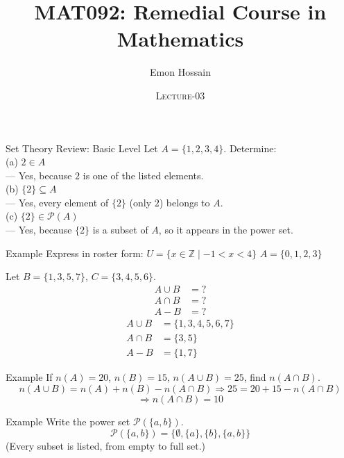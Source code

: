 \documentclass[11pt]{beamer}
\author[] %
{Emon Hossain\inst{1}}
\institute[University of Dhaka] %
{
  \inst{1}%
  Lecturer\\MNS department\\Brac University
}
\date[] %
{\textsc{Lecture-03}}
\title[]{MAT092: Remedial Course in Mathematics}
\theoremstyle{plain}
\begin{document}
\begin{frame}
\titlepage
\end{frame}

\begin{frame}{Set Theory Review: Basic Level}
\small
Let $A = \{1, 2, 3, 4\}$. Determine:  \\
(a) $2 \in A$  \\
\pause
— Yes, because $2$ is one of the listed elements.  \\
(b) $\{2\} \subseteq A$\\
\pause
— Yes, every element of $\{2\}$ (only $2$) belongs to $A$.\\
(c) $\{2\} \in \mathcal{P}(A)$\\
\pause
— Yes, because $\{2\}$ is a subset of $A$, so it appears in the power set.
\end{frame}

\begin{frame}{Example}
Express in roster form:  
$U = \{x \in \mathbb{Z} \mid -1 < x < 4\}$  
\pause
$A = \{0, 1, 2, 3\}$

Let $B = \{1,3,5,7\}$, $C = \{3,4,5,6\}$.  
\begin{align*}
A \cup B &= ?\\
A \cap B &= ? \\
A - B &= ?
\end{align*}
\pause
\begin{align*}
A \cup B &= \{1,3,4,5,6,7\} \\
A \cap B &= \{3,5\} \\
A - B &= \{1,7\}
\end{align*}
\end{frame}


\begin{frame}{Example}
    If $n(A)=20$, $n(B)=15$, $n(A \cup B)=25$, find $n(A \cap B)$.
    \pause
\[
n(A \cup B) = n(A) + n(B) - n(A \cap B) \Rightarrow 25 = 20 + 15 - n(A \cap B)
\]
\[
\Rightarrow n(A \cap B) = 10
\]
\end{frame}

\begin{frame}{Example}
    Write the power set $\mathcal{P}(\{a,b\})$.  
    \pause
\[
\mathcal{P}(\{a,b\}) = \{\emptyset, \{a\}, \{b\}, \{a,b\}\}
\]
(Every subset is listed, from empty to full set.)

\end{frame}
\end{document}
